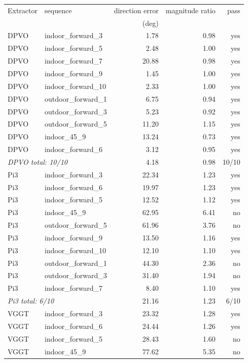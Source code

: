 \footnotesize
\begin{tabular}{llrrr}
\toprule
Extractor & sequence & direction error & magnitude ratio & pass \\
 & & (deg) & & \\
\midrule
DPVO & indoor\_forward\_3 & 1.78 & 0.98 & yes \\
DPVO & indoor\_forward\_5 & 2.48 & 1.00 & yes \\
DPVO & indoor\_forward\_7 & 20.88 & 0.98 & yes \\
DPVO & indoor\_forward\_9 & 1.45 & 1.00 & yes \\
DPVO & indoor\_forward\_10 & 2.33 & 1.00 & yes \\
DPVO & outdoor\_forward\_1 & 6.75 & 0.94 & yes \\
DPVO & outdoor\_forward\_3 & 5.23 & 0.92 & yes \\
DPVO & outdoor\_forward\_5 & 11.20 & 1.15 & yes \\
DPVO & indoor\_45\_9 & 13.24 & 0.73 & yes \\
DPVO & indoor\_forward\_6 & 3.12 & 0.95 & yes \\
\multicolumn{2}{l}{\textit{DPVO total: 10/10}} & 4.18 & 0.98 & 10/10 \\
\midrule
Pi3 & indoor\_forward\_3 & 22.34 & 1.23 & yes \\
Pi3 & indoor\_forward\_6 & 19.97 & 1.23 & yes \\
Pi3 & indoor\_forward\_5 & 12.52 & 1.12 & yes \\
Pi3 & indoor\_45\_9 & 62.95 & 6.41 & no \\
Pi3 & outdoor\_forward\_5 & 61.96 & 3.76 & no \\
Pi3 & indoor\_forward\_9 & 13.50 & 1.16 & yes \\
Pi3 & indoor\_forward\_10 & 12.10 & 1.10 & yes \\
Pi3 & outdoor\_forward\_1 & 44.30 & 2.36 & no \\
Pi3 & outdoor\_forward\_3 & 31.40 & 1.94 & no \\
Pi3 & indoor\_forward\_7 & 8.40 & 1.10 & yes \\
\multicolumn{2}{l}{\textit{Pi3 total: 6/10}} & 21.16 & 1.23 & 6/10 \\
\midrule
VGGT & indoor\_forward\_3 & 23.32 & 1.28 & yes \\
VGGT & indoor\_forward\_6 & 24.44 & 1.26 & yes \\
VGGT & indoor\_forward\_5 & 28.43 & 1.60 & no \\
VGGT & indoor\_45\_9 & 77.62 & 5.35 & no \\

\end{tabular}
